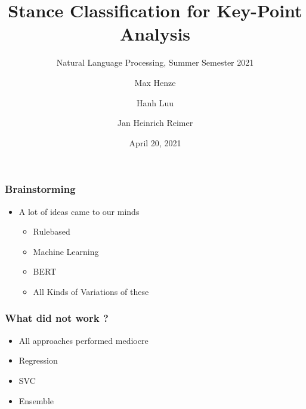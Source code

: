 \documentclass[english,handout]{mlutalk}
\title{Stance Classification for Key-Point Analysis}
\subtitle{Natural Language Processing, Summer Semester 2021}
\author{Max Henze \and Hanh Luu \and Jan Heinrich Reimer}
\institute{Martin Luther University Halle-Wittenberg}
\date{April 20, 2021}
\begin{document}
\titleframe

\begin{frame}
  \frametitle{Brainstorming}

  \begin{itemize}
    \item A lot of ideas came to our minds
    \begin{itemize}
      \item Rulebased
      \item Machine Learning
      \item BERT
      \item All Kinds of Variations of these
    \end{itemize}   
  \end{itemize}

\end{frame}

\begin{frame}
  \frametitle{What did not work ?}
    \begin{itemize}
      \item All approaches performed mediocre
      \item Regression 
      \item SVC 
      \item Ensemble 
    \end{itemize}
  

\end{frame}
\end{document}
